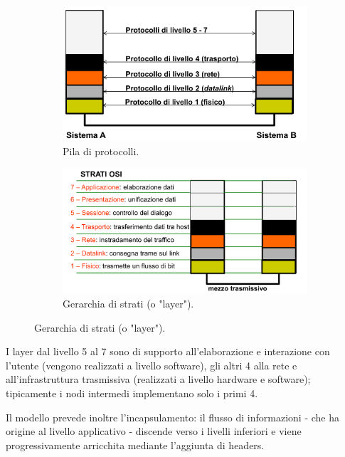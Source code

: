 \documentclass[11pt, italian, openany]{book}
\begin{document}
\begin{sloppypar}
\begin{figure}[h!]
	\begin{subfigure}{0.49 \linewidth} \centering
		\includegraphics[scale=0.22]{images/stack-protocollare-iso_osi.png}
		\caption{Pila di protocolli.}
	\end{subfigure}
	\begin{subfigure}{0.49 \linewidth} \centering
		\includegraphics[scale=0.22]{images/gerarchia-layer-iso_osi.png}
		\caption{Gerarchia di strati (o "layer").}
	\end{subfigure}
\end{figure}

I layer dal livello 5 al 7 sono di supporto all'elaborazione e interazione con l'utente (vengono realizzati a livello software), gli altri 4
alla rete e all'infrastruttura trasmissiva (realizzati a livello hardware e software); tipicamente i nodi intermedi implementano solo i primi
4.

Il modello prevede inoltre l'incapsulamento: il flusso di informazioni - che ha origine al livello applicativo - discende verso i livelli inferiori e
viene progressivamente arricchita mediante l'aggiunta di headers.


\end{sloppypar}
\end{document}
